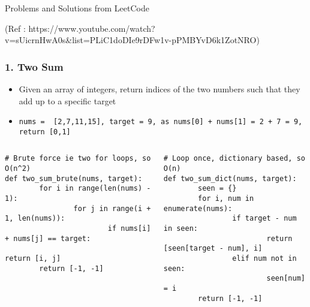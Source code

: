 \begin{frame}[fragile]\frametitle{}
\begin{center}
{\Large Problems and Solutions from LeetCode}
\end{center}

	{\tiny (Ref :  https://www.youtube.com/watch?v=sUicrnHwA0s\&list=PLiC1doDIe9rDFw1v-pPMBYvD6k1ZotNRO)}

\end{frame}

\begin{frame}[fragile]\frametitle{1. Two Sum}

	\begin{itemize}
	\item Given an array of integers, return indices of the two numbers such that they add up to a specific target
	\item \lstinline|nums =  [2,7,11,15], target = 9, as nums[0] + nums[1] = 2 + 7 = 9, return [0,1]|
	\end{itemize}
	
	\begin{columns}[T]
		\begin{lstlisting}[basicstyle=\scriptsize]
# Brute force ie two for loops, so O(n^2)
def two_sum_brute(nums, target):
		for i in range(len(nums) - 1):
				for j in range(i + 1, len(nums)):
						if nums[i] + nums[j] == target:
								return [i, j]
		return [-1, -1]		
		\end{lstlisting}
		\begin{lstlisting}[basicstyle=\scriptsize]
# Loop once, dictionary based, so O(n)
def two_sum_dict(nums, target):
		seen = {}
		for i, num in enumerate(nums):
				if target - num in seen:
						return [seen[target - num], i]
				elif num not in seen:
						seen[num] = i
		return [-1, -1]	
				\end{lstlisting}		
	\end{columns}
	
	
\end{frame}


